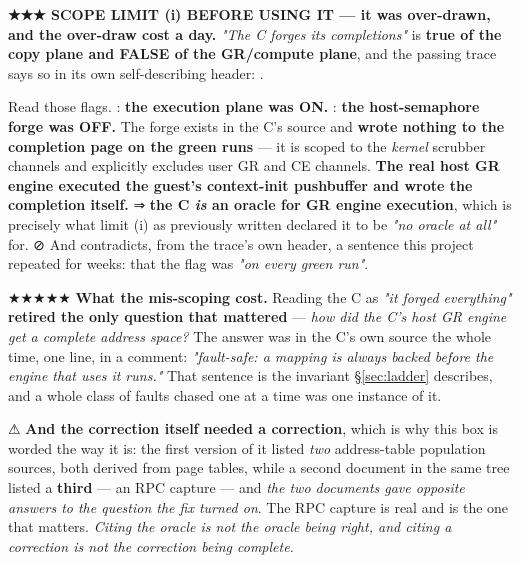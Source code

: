 \documentclass[10.5pt]{article}
\begin{document}
\begin{warnbox}\small
\textbf{★★★ SCOPE LIMIT (i) BEFORE USING IT --- it was over-drawn, and the over-draw cost a
day.} \emph{"The C forges its completions"} is \textbf{true of the copy plane and FALSE of the
GR/compute plane}, and the passing trace says so in its own self-describing header:
.

\smallskip
Read those flags. : \textbf{the execution plane was ON.} :
\textbf{the host-semaphore forge was OFF.} The forge exists in the C's source and \textbf{wrote
nothing to the completion page on the green runs} — it is scoped to the \emph{kernel} scrubber
channels and explicitly excludes user GR and CE channels. \textbf{The real host GR engine executed
the guest's context-init pushbuffer and wrote the completion itself.} ⇒ \textbf{the C \emph{is} an
oracle for GR engine execution}, which is precisely what limit (i) as previously written declared
it to be \emph{"no oracle at all"} for. ⊘ And  contradicts, from the trace's own
header, a sentence this project repeated for weeks: that the flag was \emph{"on every green run"}.

\smallskip
★★★★★ \textbf{What the mis-scoping cost.} Reading the C as \emph{"it forged everything"}
\textbf{retired the only question that mattered} — \emph{how did the C's host GR engine get a
complete address space?} The answer was in the C's own source the whole time, one line, in a
comment: \emph{"fault-safe: a mapping is always backed before the engine that uses it runs."} That
sentence is the invariant \S\ref{sec:ladder} describes, and a whole class of faults chased one at
a time was one instance of it.

\smallskip
⚠ \textbf{And the correction itself needed a correction}, which is why this box is worded the way
it is: the first version of it listed \emph{two} address-table population sources, both derived
from page tables, while a second document in the same tree listed a \textbf{third} — an RPC
capture — and \emph{the two documents gave opposite answers to the question the fix turned on}.
The RPC capture is real and is the one that matters. \emph{Citing the oracle is not the oracle
being right, and citing a correction is not the correction being complete.}
\end{warnbox}
\end{document}
